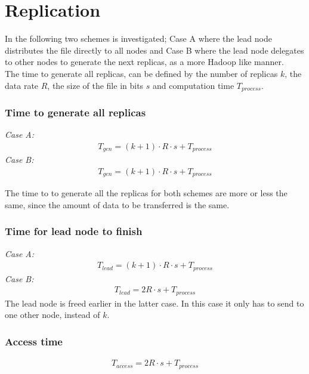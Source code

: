 \section{Replication} \label{sec:repl}
In the following two schemes is investigated; Case A where the lead node distributes the file directly to all nodes and Case B where the lead node delegates to other nodes to generate the next replicas, as a more Hadoop like manner. \\
The time to generate all replicas, can be defined by the number of replicas $k$, the data rate $R$, the size of the file in bits $s$ and computation time $T_{process}$. 

\subsubsection*{Time to generate all replicas}
\textit{Case A:} 
\begin{align} 
    T_{gen} = (k+1)\cdot R\cdot s + T_{process} \label{eq:e2_rep_A}
\end{align}
\textit{Case B:} 
\begin{align}
    T_{gen} = (k+1)\cdot R\cdot s + T_{process} \label{eq:e2_rep_B}
\end{align}

The time to to generate all the replicas for both schemes are more or less the same, since the amount of data to be transferred is the same. 

\subsubsection*{Time for lead node to finish}
\textit{Case A:}
\begin{align} 
    T_{lead} = (k+1)\cdot R\cdot s + T_{process} \label{eq:e2_lead_A}
\end{align}
\textit{Case B:}
\begin{align} 
    T_{lead} = 2R \cdot s + T_{process} \label{eq:e2_lead_B}
\end{align}
The lead node is freed earlier in the latter case. In this case it only has to send to one other node, instead of $k$.

\subsubsection*{Access time}
\begin{align}
    T_{access} = 2R \cdot s + T_{process}
\end{align}

